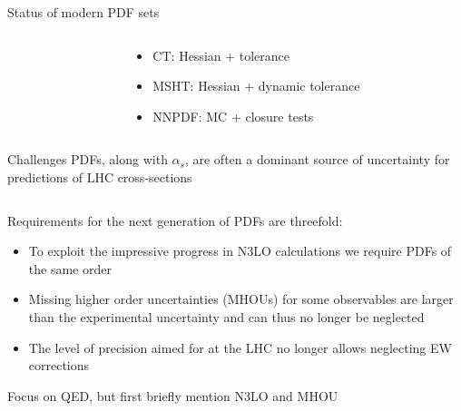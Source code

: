 \documentclass[aspectratio=169, 8pt,t]{beamer}
\begin{document}
\begin{frame}{Status of modern PDF sets}
\begin{columns}
\begin{column}{0.49\textwidth}
\begin{itemize}
      \end{itemize}    
    \end{column}
    \begin{column}{0.49\textwidth}
      \begin{itemize}
        \item CT: Hessian + tolerance
        \item MSHT: Hessian + dynamic tolerance
        \item NNPDF: MC + closure tests
      \end{itemize}    
    \end{column}
  \end{columns}
\end{frame}


\begin{frame}{Challenges}
  PDFs, along with $\alpha_s$, are often a dominant source of uncertainty for predictions of LHC cross-sections 
  \begin{columns}
    \begin{column}{0.49\textwidth}
      \vspace*{1em}

      Requirements for the next generation of PDFs are threefold:
      \begin{itemize}
        \item To exploit the impressive progress in N3LO calculations we require PDFs of the same order
        \item Missing higher order uncertainties (MHOUs) for some observables are larger than the experimental uncertainty and can thus no longer be neglected
        \item The level of precision aimed for at the LHC no longer allows neglecting EW corrections
      \end{itemize}

      \vspace*{1em}
      Focus on QED, but first briefly mention N3LO and MHOU
    \end{column}


\end{columns}
\end{frame}
\end{document}
